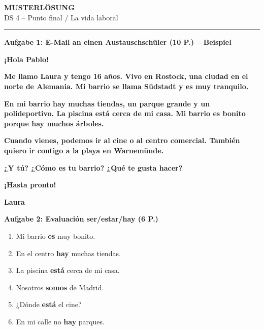 \documentclass[11pt,a4paper]{article}
\newcommand{\lsg}[1]{\textcolor{loesung}{\textbf{#1}}}
\begin{document}
\begin{center}
{\Large\textbf{\textcolor{loesung}{MUSTERLÖSUNG}}}\\[0.3em]
{\large DS 4 -- Punto final / La vida laboral}
\end{center}

\vspace{0.5em}
\hrule
\vspace{1em}

\begin{gruppenbox}

\textbf{Aufgabe 1: E-Mail an einen Austauschschüler (10 P.) -- Beispiel}

\lsg{¡Hola Pablo!}

\lsg{Me llamo Laura y tengo 16 años. Vivo en Rostock, una ciudad en el norte de Alemania. Mi barrio se llama Südstadt y es muy tranquilo.}

\lsg{En mi barrio hay muchas tiendas, un parque grande y un polideportivo. La piscina está cerca de mi casa. Mi barrio es bonito porque hay muchos árboles.}

\lsg{Cuando vienes, podemos ir al cine o al centro comercial. También quiero ir contigo a la playa en Warnemünde.}

\lsg{¿Y tú? ¿Cómo es tu barrio? ¿Qué te gusta hacer?}

\lsg{¡Hasta pronto!}

\lsg{Laura}

\vspace{0.5em}

\textbf{Aufgabe 2: Evaluación ser/estar/hay (6 P.)}
\begin{enumerate}[label=\alph*), leftmargin=2em, nosep]
    \item Mi barrio \lsg{es} muy bonito.
    \item En el centro \lsg{hay} muchas tiendas.
    \item La piscina \lsg{está} cerca de mi casa.
    \item Nosotros \lsg{somos} de Madrid.
    \item ¿Dónde \lsg{está} el cine?
    \item En mi calle no \lsg{hay} parques.
\end{enumerate}

\vspace{0.5em}


\end{gruppenbox}
\end{document}
